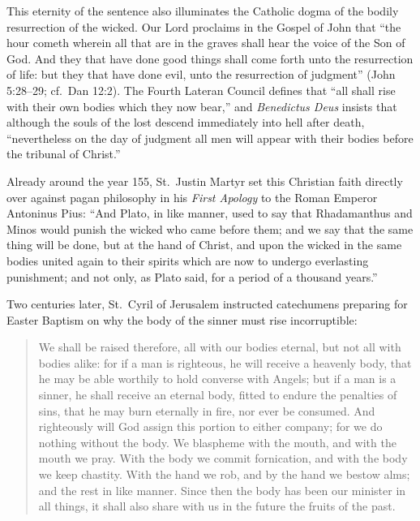 This eternity of the sentence also illuminates the Catholic dogma of the bodily resurrection of the wicked. Our Lord proclaims in the Gospel of John that ``the hour cometh wherein all that are in the graves shall hear the voice of the Son of God. And they that have done good things shall come forth unto the resurrection of life: but they that have done evil, unto the resurrection of judgment'' (John 5:28--29; cf.\ Dan 12:2). The Fourth Lateran Council defines that ``all shall rise with their own bodies which they now bear,'' and \textit{Benedictus Deus} insists that although the souls of the lost descend immediately into hell after death, ``nevertheless on the day of judgment all men will appear with their bodies before the tribunal of Christ.''

Already around the year 155, St.\ Justin Martyr set this Christian faith directly over against pagan philosophy in his \textit{First Apology} to the Roman Emperor Antoninus Pius: ``And Plato, in like manner, used to say that Rhadamanthus and Minos would punish the wicked who came before them; and we say that the same thing will be done, but at the hand of Christ, and upon the wicked in the same bodies united again to their spirits which are now to undergo everlasting punishment; and not only, as Plato said, for a period of a thousand years.''

Two centuries later, St.\ Cyril of Jerusalem instructed catechumens preparing for Easter Baptism on why the body of the sinner must rise incorruptible:

\begin{quote}
We shall be raised therefore, all with our bodies eternal, but not all with bodies alike: for if a man is righteous, he will receive a heavenly body, that he may be able worthily to hold converse with Angels; but if a man is a sinner, he shall receive an eternal body, fitted to endure the penalties of sins, that he may burn eternally in fire, nor ever be consumed. And righteously will God assign this portion to either company; for we do nothing without the body. We blaspheme with the mouth, and with the mouth we pray. With the body we commit fornication, and with the body we keep chastity. With the hand we rob, and by the hand we bestow alms; and the rest in like manner. Since then the body has been our minister in all things, it shall also share with us in the future the fruits of the past.
\end{quote}

